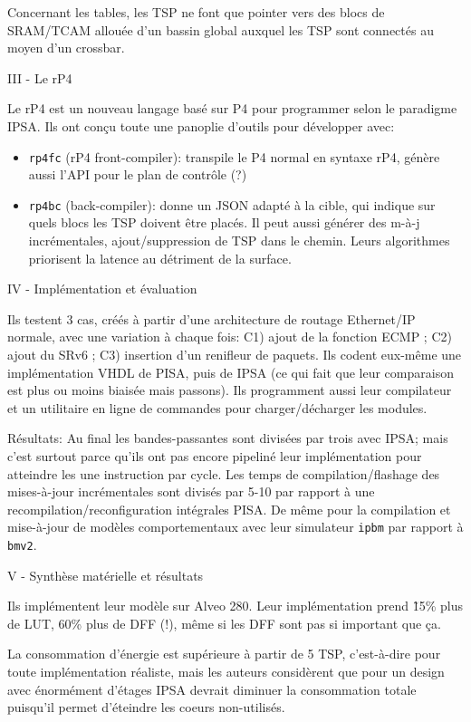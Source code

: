 Concernant les tables, les TSP ne font que pointer vers des blocs de SRAM/TCAM allouée d'un bassin global auxquel les TSP sont connectés au moyen d'un crossbar.

III - Le rP4

Le rP4 est un nouveau langage basé sur P4 pour programmer selon le paradigme IPSA. Ils ont conçu toute une panoplie d'outils pour développer avec:
\begin{itemize}
	\item{\texttt{rp4fc} (rP4 front-compiler): transpile le P4 normal en syntaxe rP4, génère aussi l'API pour le plan de contrôle (?)}
	\item{\texttt{rp4bc} (back-compiler): donne un JSON adapté à la cible, qui indique sur quels blocs les TSP doivent être placés. Il peut aussi générer des m-à-j incrémentales, ajout/suppression de TSP dans le chemin. Leurs algorithmes priorisent la latence au détriment de la surface.}
\end{itemize}

IV - Implémentation et évaluation

Ils testent 3 cas, créés à partir d'une architecture de routage Ethernet/IP normale, avec une variation à chaque fois: C1) ajout de la fonction ECMP ; C2) ajout du SRv6 ; C3) insertion d'un renifleur de paquets. Ils codent eux-même une implémentation VHDL de PISA, puis de IPSA (ce qui fait que leur comparaison est plus ou moins biaisée mais passons). Ils programment aussi leur compilateur et un utilitaire en ligne de commandes pour charger/décharger les modules.

Résultats: Au final les bandes-passantes sont divisées par trois avec IPSA; mais c'est surtout parce qu'ils ont pas encore pipeliné leur implémentation pour atteindre les une instruction par cycle. Les temps de compilation/flashage des mises-à-jour incrémentales sont divisés par 5-10 par rapport à une recompilation/reconfiguration intégrales PISA. De même pour la compilation et mise-à-jour de modèles comportementaux avec leur simulateur \texttt{ipbm} par rapport à \texttt{bmv2}.

V - Synthèse matérielle et résultats

Ils implémentent leur modèle sur Alveo 280. Leur implémentation prend \~15\% plus de LUT, 60\% plus de DFF (!), même si les DFF sont pas si important que ça.

La consommation d'énergie est supérieure à partir de 5 TSP, c'est-à-dire pour toute implémentation réaliste, mais les auteurs considèrent que pour un design avec énormément d'étages IPSA devrait diminuer la consommation totale puisqu'il permet d'éteindre les coeurs non-utilisés.

